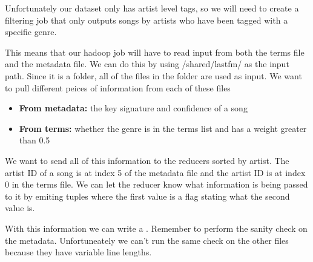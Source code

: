 \documentclass[letterpaper,10pt,openany,oneside]{sphinxmanual}
\begin{document}
Unfortunately our dataset only has artist level tags, so we will
need to create a filtering job that only outputs songs by artists
who have been tagged with a specific genre.

This means that our hadoop job will have to read input from
both the terms file and the metadata file. We can do this by
using /shared/lastfm/ as the input path. Since it is a folder,
all of the files in the folder are used as input. We want to pull
different peices of information from each of these files
\begin{itemize}
\item {} 
\textbf{From metadata:} the key signature and confidence of a song

\item {} 
\textbf{From terms:} whether the genre is in the terms list and has
a weight greater than 0.5

\end{itemize}

We want to send all of this information to the reducers
sorted by artist. The artist ID of a song is at index 5 of the
metadata file and the artist ID is at index 0 in the terms file.
We can let the reducer know what information is being passed to
it by emiting tuples where the first value is a flag stating what
the second value is.

With this information we can write a .
Remember to perform
the sanity check on the metadata. Unfortuneately we can't run
the same check on the other files because they have variable
line lengths.
\end{document}
